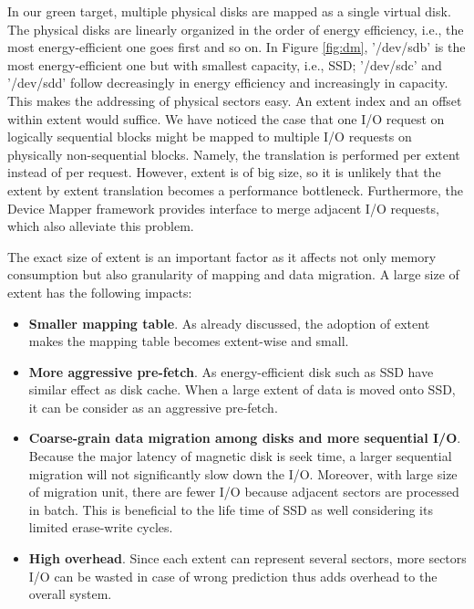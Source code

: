 In our green target, multiple physical disks are mapped as a single
virtual disk. The physical disks are linearly organized in the order
of energy efficiency, i.e., the most energy-efficient one goes first
and so on. In Figure \ref{fig:dm}, '/dev/sdb' is the most
energy-efficient one but with smallest capacity, i.e., SSD; '/dev/sdc'
and '/dev/sdd' follow decreasingly in energy efficiency and
increasingly in capacity. This makes the addressing of physical
sectors easy. An extent index and an offset within extent would
suffice. We have noticed the case that one I/O request on logically
sequential blocks might be mapped to multiple I/O requests on
physically non-sequential blocks. Namely, the translation is performed
per extent instead of per request. However, extent is of big size, so
it is unlikely that the extent by extent translation becomes a
performance bottleneck. Furthermore, the Device Mapper framework
provides interface to merge adjacent I/O requests, which also
alleviate this problem.

The exact size of extent is an important factor as it affects not only
memory consumption but also granularity of mapping and data migration.
A large size of extent has the following impacts: 

\begin{itemize} 

\item \textbf{Smaller mapping table}. As already discussed, the
adoption of extent makes the mapping table becomes extent-wise and
small. 

\item \textbf{More aggressive pre-fetch}. As energy-efficient disk such
as SSD have similar effect as disk cache. When a large extent of data
is moved onto SSD, it can be consider as an aggressive pre-fetch. 

\item \textbf{Coarse-grain data migration among disks and more
sequential I/O}. Because the major latency of magnetic disk is seek
time, a larger sequential migration will not significantly slow down
the I/O. Moreover, with large size of migration unit, there are fewer
I/O because adjacent sectors are processed in batch. This is beneficial
to the life time of SSD as well considering its limited erase-write
cycles.

\item \textbf{High overhead}. Since each extent can represent several
sectors, more sectors I/O can be wasted in case of wrong prediction
thus adds overhead to the overall system. 

\end{itemize}

